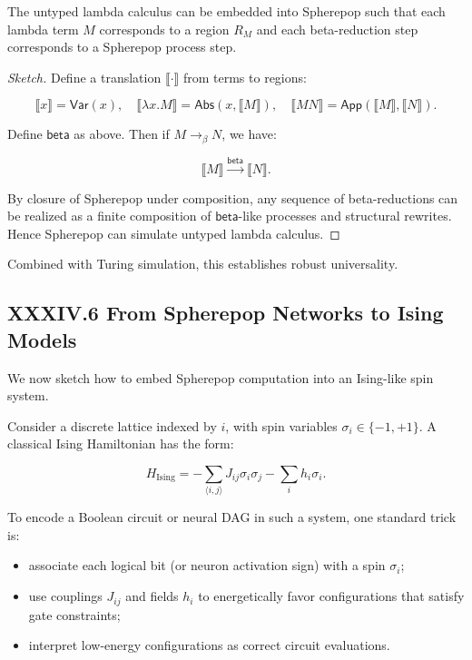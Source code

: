 \documentclass[12pt,letterpaper]{article}
\begin{document}
\begin{theorem}
The untyped lambda calculus can be embedded into Spherepop such that each lambda term $M$ corresponds to a region $R_M$ and each beta-reduction step corresponds to a Spherepop process step.
\end{theorem}

\begin{proof}[Sketch]
Define a translation $\llbracket \cdot \rrbracket$ from terms to regions:

\[
\llbracket x \rrbracket = \mathsf{Var}(x), \quad
\llbracket \lambda x. M \rrbracket = \mathsf{Abs}(x, \llbracket M \rrbracket), \quad
\llbracket M N \rrbracket = \mathsf{App}(\llbracket M \rrbracket, \llbracket N \rrbracket).
\]

Define $\mathsf{beta}$ as above. Then if $M \to_\beta N$, we have:

\[
\llbracket M \rrbracket \xrightarrow{\mathsf{beta}} \llbracket N \rrbracket.
\]

By closure of Spherepop under composition, any sequence of beta-reductions can be realized as a finite composition of $\mathsf{beta}$-like processes and structural rewrites. Hence Spherepop can simulate untyped lambda calculus.
\end{proof}

Combined with Turing simulation, this establishes robust universality.

\subsection{XXXIV.6 From Spherepop Networks to Ising Models}

We now sketch how to embed Spherepop computation into an Ising-like spin system.

Consider a discrete lattice indexed by $i$, with spin variables $\sigma_i \in \{-1,+1\}$. A classical Ising Hamiltonian has the form:

\[
H_{\text{Ising}} = -\sum_{\langle i,j\rangle} J_{ij} \sigma_i \sigma_j - \sum_i h_i \sigma_i.
\]

To encode a Boolean circuit or neural DAG in such a system, one standard trick is:

\begin{itemize}
  \item associate each logical bit (or neuron activation sign) with a spin $\sigma_i$;
  \item use couplings $J_{ij}$ and fields $h_i$ to energetically favor configurations that satisfy gate constraints;
  \item interpret low-energy configurations as correct circuit evaluations.
\end{itemize}
\end{document}
